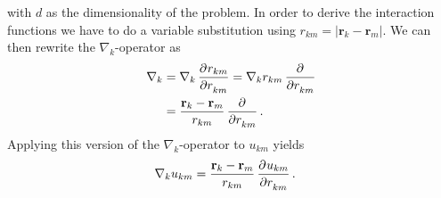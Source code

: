 \documentclass[
    a4paper, aps, twocolumn, floatfix, superscriptaddress,
    nofootinbib]{revtex4-1}
\newcommand{\vf}{\mathbf}
\newcommand{\1}{\mathds{1}}
\begin{document}
    with $d$ as the dimensionality of the problem.
    In order to derive the interaction functions we have to do a
    variable substitution using $r_{km} = |\vf{r}_k - \vf{r}_m|$. We can
    then rewrite the $\nabla_k$-operator as
    \begin{align}
        \nabla_k
        &=
        \nabla_k
        \dpd[]{r_{km}}{r_{km}}
        =
        \nabla_k r_{km} \dpd[]{}{r_{km}}
        \\
        &=
        \frac{\vf{r}_k - \vf{r}_m}{r_{km}}\dpd[]{}{r_{km}}.
    \end{align}
    Applying this version of the $\nabla_k$-operator to $u_{km}$ yields
    \begin{align}
        \nabla_k u_{km}
        &=
        \frac{\vf{r}_k - \vf{r}_m}{r_{km}}
        \dpd[]{u_{km}}{r_{km}}.
    \end{align}
\end{document}
